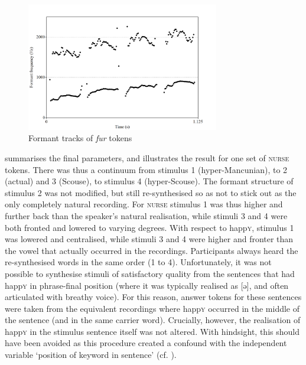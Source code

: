 \begin{figure}
	
	\includegraphics[width=0.75\textwidth]{./figures/fur_spectrogram.png}
	\caption{Formant tracks of \emph{fur} tokens}
	\label{fig.fur.spec}
\end{figure}

 summarises the final parameters, and  illustrates the result for one set of \textsc{nurse} tokens.
There was thus a continuum from stimulus 1 (hyper-Mancunian), to 2 (actual) and 3 (Scouse), to stimulus 4 (hyper-Scouse).
The formant structure of stimulus 2 was not modified, but still re-synthesised so as not to stick out as the only completely natural recording.
For \textsc{nurse} stimulus 1 was thus higher and further back than the speaker's natural realisation, while stimuli 3 and 4 were both fronted and lowered to varying degrees.
With respect to happ\textsc{y}, stimulus 1 was lowered and centralised, while stimuli 3 and 4 were higher and fronter than the vowel that actually occurred in the recordings.
Participants always heard the re-synthesised words in the same order (1 to 4).
Unfortunately, it was not possible to synthesise stimuli of satisfactory quality from the sentences that had happ\textsc{y} in phrase-final position (where it was typically realised as [ə], and often articulated with breathy voice).
For this reason, answer tokens for these sentences were taken from the equivalent recordings where happ\textsc{y} occurred in the middle of the sentence (and in the same carrier word).
Crucially, however, the realisation of happ\textsc{y} in the stimulus sentence itself was not altered.
With hindsight, this should have been avoided as this procedure created a confound with the independent variable `position of keyword in sentence' (cf. ).

